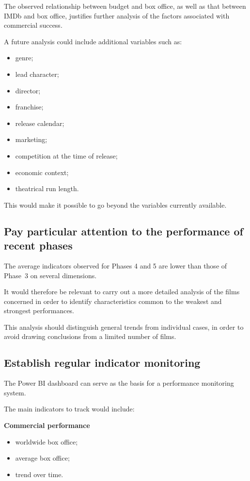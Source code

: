 \documentclass[a4paper,11pt]{article}
\begin{document}
The observed relationship between budget and box office, as well as
that between IMDb and box office, justifies further analysis of the
factors associated with commercial success.

A future analysis could include additional variables such as:
\begin{itemize}
  \item genre;
  \item lead character;
  \item director;
  \item franchise;
  \item release calendar;
  \item marketing;
  \item competition at the time of release;
  \item economic context;
  \item theatrical run length.
\end{itemize}

This would make it possible to go beyond the variables currently
available.

\subsection{Pay particular attention to the performance of recent
phases}

The average indicators observed for Phases 4 and 5 are lower than those
of Phase~3 on several dimensions.

It would therefore be relevant to carry out a more detailed analysis of
the films concerned in order to identify characteristics common to the
weakest and strongest performances.

This analysis should distinguish general trends from individual cases,
in order to avoid drawing conclusions from a limited number of films.

\subsection{Establish regular indicator monitoring}

The Power BI dashboard can serve as the basis for a performance
monitoring system.

The main indicators to track would include:

\textbf{Commercial performance}
\begin{itemize}
  \item worldwide box office;
  \item average box office;
  \item trend over time.
\end{itemize}
\end{document}
